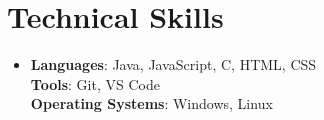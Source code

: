 \documentclass[letterpaper,11pt]{article}
\begin{document}
\section{Technical Skills} %
\begin{itemize}[leftmargin=0.15in, label={}]
\item{
\textbf{Languages}{: Java, JavaScript, C, HTML, CSS} \\
\textbf{Tools}{: Git, VS Code} \\
\textbf{Operating Systems}{: Windows, Linux}
} \\
\end{itemize}


\end{document}
